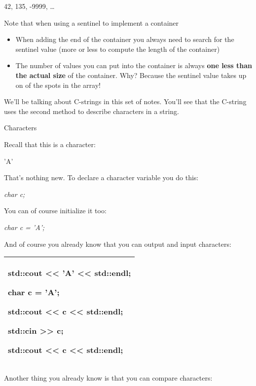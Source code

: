 \documentclass[
]{article}
\providecommand{\tightlist}{%
  \setlength{\itemsep}{0pt}\setlength{\parskip}{0pt}}
\begin{document}
42, 135, -9999, \ldots{}

Note that when using a sentinel to implement a container

\begin{itemize}
\tightlist
\item
  When adding the end of the container you always need to search for the
  sentinel value (more or less to compute the length of the container)
\item
  The number of values you can put into the container is always
  \textbf{one less than the actual size} of the container. Why? Because
  the sentinel value takes up on of the spots in the array!
\end{itemize}

We'll be talking about C-strings in this set of notes. You'll see that
the C-string uses the second method to describe characters in a string.

Characters

Recall that this is a character:

'A'

That's nothing new. To declare a character variable you do this:

\emph{char c;}

You can of course initialize it too:

\emph{char c = 'A';}

And of course you already know that you can output and input characters:

\begin{longtable}[]{@{}l@{}}
\toprule
\endhead
\begin{minipage}[t]{0.97\columnwidth}\raggedright
std::cout \textless\textless{} 'A' \textless\textless{} std::endl;

char c = 'A';

std::cout \textless\textless{} c \textless\textless{} std::endl;

std::cin \textgreater\textgreater{} c;

std::cout \textless\textless{} c \textless\textless{} std::endl;\strut
\end{minipage}\tabularnewline
\bottomrule
\end{longtable}

Another thing you already know is that you can compare characters:
\end{document}
